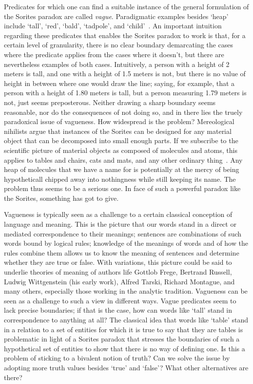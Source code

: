 \documentclass[a4paper]{article}
\begin{document}
Predicates for which one can find a suitable instance of the general formulation of the Sorites paradox are called \emph{vague}.
Paradigmatic examples besides `heap' include `tall', `red', `bald', `tadpole', and `child'~\parencite{Keefe1997}.
An important intuition regarding these predicates that enables the Sorites paradox to work is that, for a certain level of granularity, there is no clear boundary demarcating the cases where the predicate applies from the cases where it doesn't, but there are nevertheless examples of both cases.
Intuitively, a person with a height of 2 meters is tall, and one with a height of 1.5 meters is not, but there is no value of height in between where one would draw the line; saying, for example, that a person with a height of 1.80 meters is tall, but a person measuring 1.79 meters is not, just seems preposterous.
Neither drawing a sharp boundary seems reasonable, nor do the consequences of not doing so, and in there lies the truely paradoxical issue of vagueness.
How widespread is the problem?
Mereological nihilists argue that instances of the Sorites can be designed for any material object that can be decomposed into small enough parts.
If we subscribe to the scientific picture of material objects as composed of molecules and atoms, this applies to tables and chairs, cats and mats, and any other ordinary thing~\parencite{Unger1979}.
Any heap of molecules that we have a name for is potentially at the mercy of being hypotheticall chipped away into nothingness while still keeping its name.
The problem thus seems to be a serious one.
In face of such a powerful paradox like the Sorites, something has got to give.

Vagueness is typically seen as a challenge to a certain classical conception of language and meaning.
This is the picture that our words stand in a direct or mediated correspondence to their meanings; sentences are combinations of such words bound by logical rules; knowledge of the meanings of words and of how the rules combine them allows us to know the meaning of sentences and determine whether they are true or false.
With variations, this picture could be said to underlie theories of meaning of authors life Gottlob Frege, Bertrand Russell, Ludwig Wittgenstein (his early work), Alfred Tarski, Richard Montague, and many others, especially those working in the analytic tradition.
Vagueness can be seen as a challenge to such a view in different ways.
Vague predicates seem to lack precise boundaries; if that is the case, how can words like `tall' stand in correspondence to anything at all?
The classical idea that words like `table' stand in a relation to a set of entities for which it is true to say that they are tables is problematic in light of a Sorites paradox that stresses the boundaries of such a hypothetical set of entities to show that there is no way of defining one.
Is this a problem of sticking to a bivalent notion of truth?
Can we solve the issue by adopting more truth values besides `true' and `false'?
What other alternatives are there?
\end{document}
